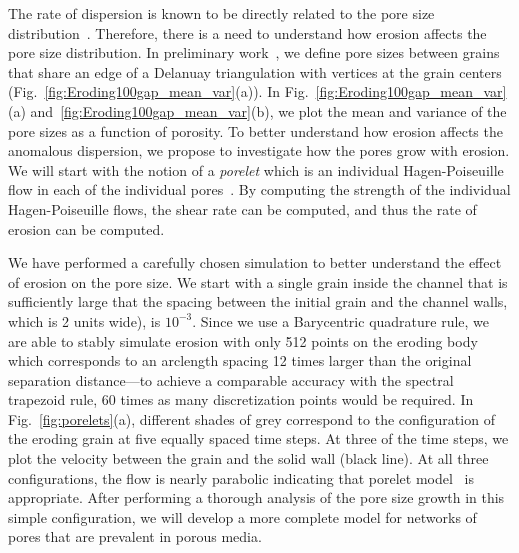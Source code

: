 \documentclass[11pt]{article}
\begin{document}
The rate of dispersion is known to be directly related to the pore size
distribution~\cite{dea-qua-bir-jua2018}. Therefore, there is a need to
understand how erosion affects the pore size distribution. In
preliminary work~\cite{chi-moo-qua2019}, we define pore sizes between
grains that share an edge of a Delanuay triangulation with vertices at
the grain centers (Fig.~\ref{fig:Eroding100gap_mean_var}(a)). In Fig.~\ref{fig:Eroding100gap_mean_var}(a) and~\ref{fig:Eroding100gap_mean_var}(b), we plot the mean and variance of the pore sizes as a function of porosity. To better understand how erosion affects the anomalous dispersion, we propose to investigate how the pores grow with erosion. We will start with the notion of a {\em porelet} which is an individual Hagen-Poiseuille flow in each of the individual pores~\cite{dea-qua-bir-jua2018}. By computing the strength of the individual Hagen-Poiseuille flows, the shear rate can be computed, and thus the rate of erosion can be computed. 

We have performed a carefully chosen simulation to better understand the
effect of erosion on the pore size. We start with a single grain inside
the channel that is sufficiently large that the spacing between the
initial grain and the channel walls, which is 2 units wide), is
$10^{-3}$. Since we use a Barycentric quadrature rule, we are able to
stably simulate erosion with only 512 points on the eroding body which
corresponds to an arclength spacing 12 times larger than the original
separation distance---to achieve a comparable accuracy with the spectral
trapezoid rule, 60 times as many discretization points would be
required. In Fig.~\ref{fig:porelets}(a), different shades of grey
correspond to the configuration of the eroding grain at five equally
spaced time steps. At three of the time steps, we plot the velocity
between the grain and the solid wall (black line). At all three
configurations, the flow is nearly parabolic indicating that  porelet
model~\cite{dea-qua-bir-jua2018} is appropriate. After performing a
thorough analysis of the pore size growth in this simple configuration,
we will develop a more complete model for networks of pores that are
prevalent in porous media.
\end{document}
